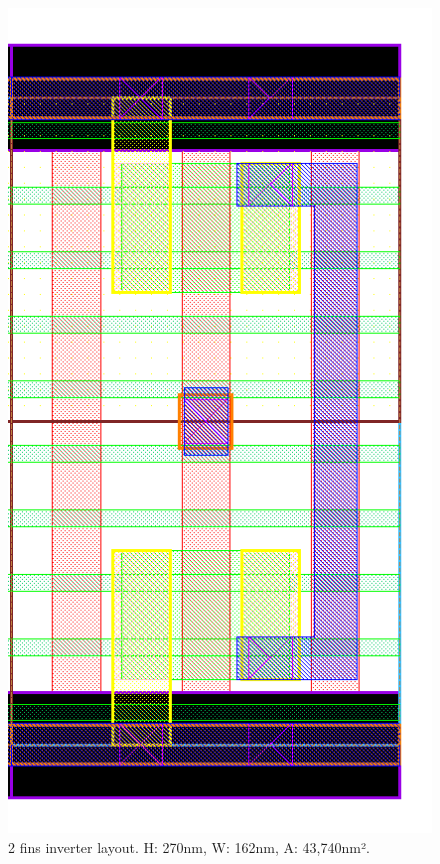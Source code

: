 \documentclass[pgmicro,diss,english]{iiufrgs}
\begin{document}
\begin{figure}[]
\centering
\includegraphics[width=\textwidth,height=\textheight,keepaspectratio]{INV2F.png}
\caption{2 fins inverter layout. H: 270nm, W: 162nm, A: 43,740nm².}
\label{fig:INV2F}
\end{figure}
\end{document}
